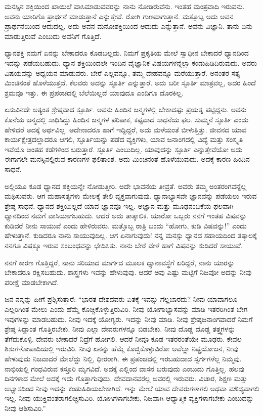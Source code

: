 ಮನಸ್ಸಿನ ಶಕ್ತಿಯಿಂದ ಖಾಯಿಲೆ ವಾಸಿಮಾಡುವವರನ್ನು ನಾನು ನೋಡಿರುವೆನು. ಇಂತಹ ಮಂತ್ರವಾದಿ ಇರುವನು. ಅವನು ಯಾರಿಗೊ ಪ್ರಾರ್ಥನೆ ಮಾಡುತ್ತಾನೆ ಎನ್ನುತ್ತೇವೆ. ರೋಗಿ ಗುಣವಾಗುತ್ತಾನೆ. ಮತ್ತೊಬ್ಬ ಅದು ಅವನ ಪ್ರಾರ್ಥನೆಯಿಂದ ಆದುದಲ್ಲ, ಅದು ಅವನ ಮನೋಶಕ್ತಿಯಿಂದ ಆದುದು ಎನ್ನುತ್ತಾನೆ. ಅವನು ವಿಜ್ಞಾನಿ. ತಾನು ಏನು ಮಾಡುತ್ತಿರುವೆ ಎಂಬುದು ಅವನಿಗೆ ಗೊತ್ತಿದೆ.

\newpage

ಧ್ಯಾನಶಕ್ತಿ ನಮಗೆ ಏನನ್ನು ಬೇಕಾದರೂ ಕೊಡಬಲ್ಲದು. ನಿಮಗೆ ಪ್ರಕೃತಿಯ ಮೇಲೆ ಸ್ವಾಧೀನ ಬೇಕಾದರೆ ಧ್ಯಾನದಿಂದ ಇದನ್ನು ಪಡೆಯಬಹುದು. ಧ್ಯಾನ ಶಕ್ತಿಯಿಂದಲೇ ಇಂದಿನ ವೈಜ್ಞಾನಿಕ ವಿಷಯಗಳನ್ನೆಲ್ಲಾ ಕಂಡುಹಿಡಿದಿರುವುದು. ಅವರು ವಿಷಯವನ್ನು ಅಧ್ಯಯನ ಮಾಡುವರು. ಬೇರೆ ಎಲ್ಲವನ್ನೂ, ತಮ್ಮ ದೇಹವನ್ನೂ ಮರೆಯುತ್ತಾರೆ. ಅನಂತರ ಸತ್ಯ ಮಿಂಚಿನಂತೆ ಹೊಳೆಯುತ್ತದೆ. ಕೆಲವರು ಅದನ್ನು ಸ್ಫೂರ್ತಿ ಎನ್ನುತ್ತಾರೆ. ಅದು ಬರೀ ಸ್ಫೂರ್ತಿ ಮಾತ್ರವಲ್ಲ, ಅದರ ಹಿಂದೆ ಶ್ರಮವೂ ಇತ್ತು. ಈ ಪ್ರಪಂಚದಲ್ಲಿ ಬೆಲೆಯಿಲ್ಲದೆ ಯಾವುದೂ ಎಂದಿಗೂ ದೊರಕಿಲ್ಲ.

ಏಸುವಿನದೇ ಅತ್ಯಂತ ಶ್ರೇಷ್ಠವಾದ ಸ್ಫೂರ್ತಿ. ಅವನು ಹಿಂದಿನ ಜನ್ಮಗಳಲ್ಲಿ ಬೇಕಾದಷ್ಟು ಪ್ರಯತ್ನ ಪಟ್ಟಿದ್ದನು. ಅವನು ಕೊನೆಯ ಜನ್ಮದಲ್ಲಿ ಸಾಧಿಸಿದ್ದು ಹಿಂದಿನ ಜನ್ಮಗಳ ಪರಿಪಾಕ, ಕಷ್ಟವಾದ ಸಾಧನೆಯ ಫಲ. ಸುಮ್ಮನೆ ಸ್ಫೂರ್ತಿ ಎಂದು ಹೇಳಿದರೆ ಅದಕ್ಕೆ ಅರ್ಥವಿಲ್ಲ. ಅದೇನಾದರೂ ಹಾಗೆ ಇದ್ದಿದ್ದರೆ, ಅದು ಮಳೆಯಂತೆ ಬೀಳುತ್ತಿತ್ತು. ಜೀವನದ ಯಾವ ಕಾರ್ಯಕ್ಷೇತ್ರದಲ್ಲಾದರೂ ಆಗಲಿ, ಸ್ಫೂರ್ತಿಯನ್ನು ಪಡೆದ ವ್ಯಕ್ತಿಗಳು, ಯಾವ ಜನಾಂಗದಲ್ಲಿ ವಿದ್ಯೆ ಮತ್ತು ಸಂಸ್ಕೃತಿ ಇವೆಯೊ ಅಂತಹ ಕಡೆಗಳಿಂದ ಬರುತ್ತಾರೆ. ಸ್ಫೂರ್ತಿ ಎಂಬುದಿಲ್ಲ. ಯಾವುದನ್ನು ಸ್ಫೂರ್ತಿ ಎನ್ನುತ್ತೇವೆಯೋ ಅದು ಈಗಾಗಲೇ ಮನಸ್ಸಿನಲ್ಲಿರುವ ಕಾರಣಗಳ ಫಲಿತಾಂಶ. ಅದು ಮಿಂಚಿನಂತೆ ಹೊಳೆಯುವುದು. ಅದಕ್ಕೆ ಕಾರಣ ಹಿಂದಿನ ಸಾಧನೆ.

ಅಲ್ಲಿಯೂ ಕೂಡ ಧ್ಯಾನದ ಶಕ್ತಿಯನ್ನೇ ನೋಡುತ್ತೀರಿ. ಅದೇ ಭಾವನೆಯ ತೀವ್ರತೆ. ಅವರು ತಮ್ಮ ಅಂತರಂಗವನ್ನೆಲ್ಲ ಮಥಿಸುವರು. ಆಗ ಮಹಾಸತ್ಯಗಳು ಮೇಲಕ್ಕೆ ತೇಲಿ ವ್ಯಕ್ತವಾಗುವುವು. ಧ್ಯಾನಾಭ್ಯಾಸವೇ ಜ್ಞಾನವನ್ನು ಪಡೆಯಲು ಇರುವ ಶ್ರೇಷ್ಠ ಸಾಧನೆ. ಧ್ಯಾನದ ಶಕ್ತಿಯಿಲ್ಲದೆ ಯಾವ ಜ್ಞಾನವೂ ಇಲ್ಲ. ಅಜ್ಞಾನ ಮತ್ತು ಮೂಢನಂಬಿಕೆಯ ಫಲವಾಗಿ ಧ್ಯಾನದಿಂದ ನಮಗೆ ವಾಸಿಯಾಗಬಹುದು. ಆದರೆ ಅದು ತಾತ್ಕಾಲಿಕ. ಯಾರೋ ಒಬ್ಬರು ನನಗೆ ಇಂತಹ ವಿಷವನ್ನು ಕುಡಿದರೆ ನೀನು ಸಾಯುವೆ ಎಂದು ಹೇಳಿರುವರು. ಮತ್ತೊಬ್ಬ ರಾತ್ರಿ ಬಂದು “ಹೋಗು, ಕುಡಿ ವಿಷವನ್ನು!'' ಎಂದು ಹೇಳುತ್ತಾನೆ. ಕುಡಿದರೂ ನಾನು ಸಾಯುವುದಿಲ್ಲ. ಆಗ ಏನಾಗುವುದು! ನನ್ನ ಮನಸ್ಸು ಧ್ಯಾನದ ಸಹಾಯದಿಂದ ತತ್ಕಾಲಕ್ಕೆ ನನಗೂ ವಿಷಕ್ಕೂ ಇರುವ ಸಂಬಂಧವನ್ನು ಛೇದಿಸಿತು. ನಾನು ಬೇರೆ ವೇಳೆ ಹಾಗೆ ವಿಷವನ್ನು ಕುಡಿದರೆ ಸಾಯುವೆ.

ನನಗೆ ಕಾರಣ ಗೊತ್ತಿದ್ದರೆ, ನಾನು ಸರಿಯಾದ ಮಾರ್ಗದ ಮೂಲಕ ಧ್ಯಾನಾವಸ್ಥೆಗೆ ಏರಿದ್ದರೆ, ನಾನು ಯಾರನ್ನು ಬೇಕಾದರೂ ರಕ್ಷಿಸಬಹುದು. ಶಾಸ್ತ್ರಗಳು ಇವನ್ನು ಹೇಳುವುವು. ಆದರೆ ಅವು ಎಷ್ಟು ಮಟ್ಟಿಗೆ ನಿಜವೋ ಅದನ್ನು ನೀವು ಪರೀಕ್ಷೆ ಮಾಡಬೇಕಾಗಿದೆ.

ಜನ ನನ್ನನ್ನು ಹೀಗೆ ಪ್ರಶ್ನಿಸುತ್ತಾರೆ: “ಭಾರತ ದೇಶದವರು ಏತಕ್ಕೆ ಇವನ್ನು ಗೆಲ್ಲಬಾರದು? ನೀವು ಯಾವಾಗಲೂ ಎಲ್ಲರಿಗಿಂತ ಮೇಲು ಎಂದು ಹೆಮ್ಮೆ ಕೊಚ್ಚಿಕೊಳ್ಳುತ್ತಿರುವಿರಿ. ನೀವು ಯೋಗಾಭ್ಯಾಸವನ್ನು ಮಾಡಿ ಇತರರಿಗಿಂತ ಬೇಗ ಇವುಗಳನ್ನು ಮಾಡಬಹುದು. ನೀವು ಇದಕ್ಕೆ ಯೋಗ್ಯರು. ಇದನ್ನು ನೀವು ಮಾಡಿ. ನೀವು ಶ್ರೇಷ್ಠ\break ಜನಾಂಗವಾದರೆ ನಿಮಗೆ ಶ್ರೇಷ್ಠ ಸಿದ್ದಾಂತ ಗೊತ್ತಿರಬೇಕು. ನೀವು ಎಲ್ಲಾ ದೇವರುಗಳನ್ನೂ ಬಿಡಬೇಕು. ನೀವು ದೊಡ್ಡ ದೊಡ್ಡ ತತ್ತ್ವಗಳನ್ನು ತೆಗೆದುಕೊಳ್ಳಿ. ದೇವರು ಬೇಕಾದರೆ ನಿದ್ರೆಗೆ ಹೋಗಲಿ. ಆದರೆ ನೀವೂ ಕೂಡ ಇತರರಂತೆಯೇ ಮೂಢರು. ಕೇವಲ ಶಿಶುಗಳೋಪಾದಿಯಲ್ಲಿ ಇರುವಿರಿ. ನೀವು ಏನನ್ನು ಹೆಮ್ಮೆ ಕೊಚ್ಚಿಕೊಳ್ಳುವಿರೋ ಅವೆಲ್ಲಾ ನಿಷ್ಪ್ರಯೋಜನ, ನೀವು ಹೇಳುವುದು ನಿಜವಾದರೆ ಮೇಲೆದ್ದು ನಿಲ್ಲಿ, ಧೀರರಾಗಿ. ಈ ಪ್ರಪಂಚದಲ್ಲಿ ಇರಬಹುದಾದ ಸ್ವರ್ಗಗಳೆಲ್ಲ ನಿಮ್ಮವು. ನಾಭಿಯಲ್ಲಿ ಗಂಧವಿರುವ ಕಸ್ತೂರಿ ಮೃಗವಿದೆ. ಅದಕ್ಕೆ ಎಲ್ಲಿಂದ ವಾಸನೆ ಬರುವುದು ಎಂಬುದು ಗೊತ್ತಿಲ್ಲ. ಹಲವು ದಿನಗಳಾದ ಮೇಲೆ ಅದಕ್ಕೆ ಇದು ಗೊತ್ತಾಗುವುದು. ದೇವದಾನವರೆಲ್ಲ ಅವರಲ್ಲಿ ಇರುವರು. ವಿಚಾರ, ಶಿಕ್ಷಣ ಮತ್ತು ಅಭ್ಯಾಸದಿಂದ ನೀವು ಇದನ್ನು ಕಂಡುಹಿಡಿಯಬೇಕಾಗಿದೆ. ಇನ್ನು ಮೇಲೆ ಯಾವ ದೇವರುಗಳಾಗಲಿ ಅಥವಾ ಮೌಡ್ಯವಾಗಲಿ ಇಲ್ಲ. ನೀವು ಯುಕ್ತಿವಂತರಾಗಲಿಚ್ಚಿಸುವಿರಿ. ಯೋಗಿಗಳಾಗಬೇಕು, ನಿಜವಾಗಿ ಆಧ್ಯಾತ್ಮಿಕ ವ್ಯಕ್ತಿಗಳಾಗಬೇಕು ಎಂಬುದನ್ನು ನೀವು ಆಶಿಸುವಿರಿ.”

